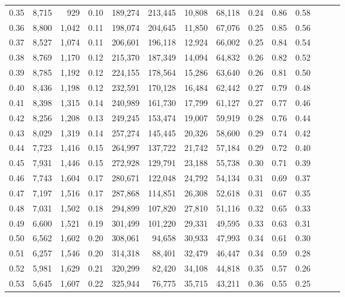 \begin{tabular}{rrrrrrrrrrrrrr}
0.35 &  8,715 &    929 &  0.10 &  189,274 &  213,445 &  10,808 &  68,118 &  0.24 &  0.86 &      0.58 \\
0.36 &  8,800 &  1,042 &  0.11 &  198,074 &  204,645 &  11,850 &  67,076 &  0.25 &  0.85 &      0.56 \\
0.37 &  8,527 &  1,074 &  0.11 &  206,601 &  196,118 &  12,924 &  66,002 &  0.25 &  0.84 &      0.54 \\
0.38 &  8,769 &  1,170 &  0.12 &  215,370 &  187,349 &  14,094 &  64,832 &  0.26 &  0.82 &      0.52 \\
0.39 &  8,785 &  1,192 &  0.12 &  224,155 &  178,564 &  15,286 &  63,640 &  0.26 &  0.81 &      0.50 \\
0.40 &  8,436 &  1,198 &  0.12 &  232,591 &  170,128 &  16,484 &  62,442 &  0.27 &  0.79 &      0.48 \\
0.41 &  8,398 &  1,315 &  0.14 &  240,989 &  161,730 &  17,799 &  61,127 &  0.27 &  0.77 &      0.46 \\
0.42 &  8,256 &  1,208 &  0.13 &  249,245 &  153,474 &  19,007 &  59,919 &  0.28 &  0.76 &      0.44 \\
0.43 &  8,029 &  1,319 &  0.14 &  257,274 &  145,445 &  20,326 &  58,600 &  0.29 &  0.74 &      0.42 \\
0.44 &  7,723 &  1,416 &  0.15 &  264,997 &  137,722 &  21,742 &  57,184 &  0.29 &  0.72 &      0.40 \\
0.45 &  7,931 &  1,446 &  0.15 &  272,928 &  129,791 &  23,188 &  55,738 &  0.30 &  0.71 &      0.39 \\
0.46 &  7,743 &  1,604 &  0.17 &  280,671 &  122,048 &  24,792 &  54,134 &  0.31 &  0.69 &      0.37 \\
0.47 &  7,197 &  1,516 &  0.17 &  287,868 &  114,851 &  26,308 &  52,618 &  0.31 &  0.67 &      0.35 \\
0.48 &  7,031 &  1,502 &  0.18 &  294,899 &  107,820 &  27,810 &  51,116 &  0.32 &  0.65 &      0.33 \\
0.49 &  6,600 &  1,521 &  0.19 &  301,499 &  101,220 &  29,331 &  49,595 &  0.33 &  0.63 &      0.31 \\
0.50 &  6,562 &  1,602 &  0.20 &  308,061 &   94,658 &  30,933 &  47,993 &  0.34 &  0.61 &      0.30 \\
0.51 &  6,257 &  1,546 &  0.20 &  314,318 &   88,401 &  32,479 &  46,447 &  0.34 &  0.59 &      0.28 \\
0.52 &  5,981 &  1,629 &  0.21 &  320,299 &   82,420 &  34,108 &  44,818 &  0.35 &  0.57 &      0.26 \\
0.53 &  5,645 &  1,607 &  0.22 &  325,944 &   76,775 &  35,715 &  43,211 &  0.36 &  0.55 &      0.25 \\

\end{tabular}
